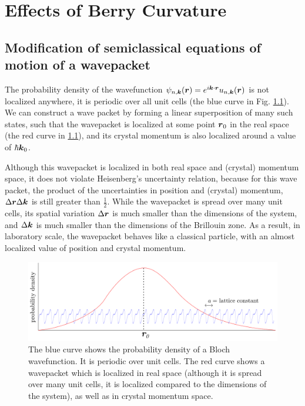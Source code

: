 \documentclass{report}
\renewcommand\vec[1]{\ensuremath\boldsymbol{#1}} %
\begin{document}
\chapter{Effects of Berry Curvature}
\section{Modification of semiclassical equations of motion of a wavepacket}
The probability density of the wavefunction $\psi_{n, \vec{k}} (\vec{r}) = e^{i \vec{k}\cdot \vec{r}} u_{n,\vec{k}} (\vec{r})$ is not localized anywhere, it is periodic over all unit cells (the blue curve in Fig. \ref{fig:wavepacket-and-bloch-wave}). We can construct a wave packet by forming a linear superposition of many such states, such that the wavepacket is localized at some point $\vec{r}_0$ in the real space (the red curve in \ref{fig:wavepacket-and-bloch-wave}), and its crystal momentum is also localized around a value of $\hbar \vec{k}_0$.

Although this wavepacket is localized in both real space and (crystal) momentum space, it does not violate Heisenberg's uncertainty relation, because for this wave packet, the product of the uncertainties in position and (crystal) momentum, $\Delta \vec{r} \Delta \vec{k}$ is still greater than $\frac{1}{2}$. While the wavepacket is spread over many unit cells, its spatial variation $\Delta \vec{r}$ is much smaller than the dimensions of the system, and $\Delta \vec{k}$ is much smaller than the dimensions of the Brillouin zone. As a result, in laboratory scale, the wavepacket behaves like a classical particle, with an almost localized value of position and crystal momentum.

\begin{figure}[h!]
	\centering
	\includegraphics[width=0.7\linewidth]{wavepacket-and-Bloch-wave}
	\caption{The blue curve shows the probability density of a Bloch wavefunction. It is periodic over unit cells. The red curve shows a wavepacket which is localized in real space (although it is spread over many unit cells, it is localized compared to the dimensions of the system), as well as in crystal momentum space.}
	\label{fig:wavepacket-and-bloch-wave}
\end{figure}
\end{document}

